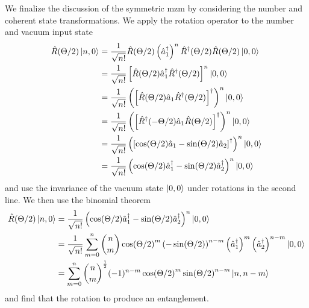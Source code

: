 We finalize the discussion of the symmetric \gls{mzm} by considering the number and coherent state transformations.
We apply the rotation operator to the number and vacuum input state
\begin{equation}
	\begin{split}
		\hat{R}(\Theta/2)
		\ket{n,0}
		&=
		\frac{1}{\sqrt{n!}}
		\hat{R}(\Theta/2)
		\left(\hat{a}_1^\dagger\right)^n
		\hat{R}^\dagger(\Theta/2)
		\hat{R}(\Theta/2)
		\ket{0,0}
		\\
		&=
		\frac{1}{\sqrt{n!}}
		\left[
			\hat{R}(\Theta/2)
			\hat{a}_1^\dagger
			\hat{R}^\dagger(\Theta/2)
		\right]^n
		\ket{0,0}
		\\
		&=
		\frac{1}{\sqrt{n!}}
		\left(
			\left[
				\hat{R}(\Theta/2)
				\hat{a}_1
				\hat{R}^\dagger(\Theta/2)
			\right]^\dagger
		\right)^n
		\ket{0,0}
		\\
		&=
		\frac{1}{\sqrt{n!}}
		\left(
			\left[
				\hat{R}^\dagger(-\Theta/2)
				\hat{a}_1
				\hat{R}(\Theta/2)
			\right]^\dagger
		\right)^n
		\ket{0,0}
		\\
		&=
		\frac{1}{\sqrt{n!}}
		\left(
			\left[
				\cos(\Theta/2)
				\hat{a}_1
				-
				\sin(\Theta/2)
				\hat{a}_2
			\right]^\dagger
		\right)^n
		\ket{0,0}
		\\
		&=
		\frac{1}{\sqrt{n!}}
		\left(
			\cos(\Theta/2)
			\hat{a}_1^\dagger
			-
			\sin(\Theta/2)
			\hat{a}_2^\dagger
		\right)^n
		\ket{0,0}
	\end{split}
\end{equation}
and use the invariance of the vacuum state $\ket{0,0}$ under rotations in the second line.
We then use the binomial theorem
\begin{equation}
	\begin{split}
		\hat{R}(\Theta/2)
		\ket{n,0}
		&=
		\frac{1}{\sqrt{n!}}
		\left(
			\cos(\Theta/2)
			\hat{a}_1^\dagger
			-
			\sin(\Theta/2)
			\hat{a}_2^\dagger
		\right)^n
		\ket{0,0}
		\\
		&=
		\frac{1}{\sqrt{n!}}
		\sum_{m=0}^n
		\binom{n}{m}
		\cos(\Theta/2)^m
		\left(
			-\sin(\Theta/2)
		\right)^{n-m}
		\left(\hat{a}_1^\dagger\right)^m
		\left(\hat{a}_2^\dagger\right)^{n-m}
		\ket{0,0}
		\\
		&=
		\sum_{m=0}^n
		\binom{n}{m}^\frac{1}{2}
		(-1)^{n-m}
		\cos(\Theta/2)^m
		\sin(\Theta/2)^{n-m}
		\ket{n,n-m}
	\end{split}
\end{equation}
and find that the rotation to produce an entanglement.

